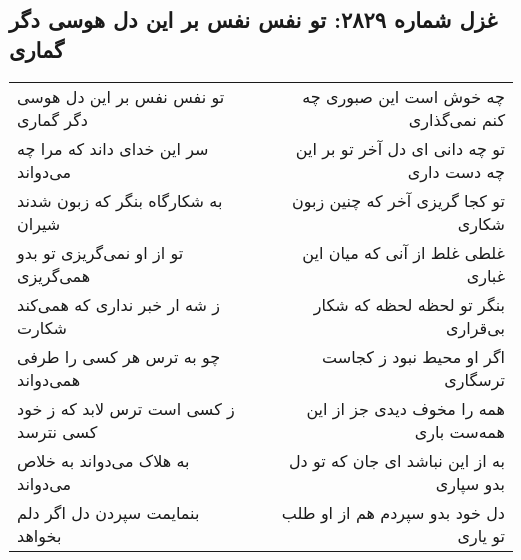 \begin{center}
\section*{غزل شماره ۲۸۲۹: تو نفس نفس بر این دل هوسی دگر گماری}
\label{sec:2829}
\begin{longtable}{l p{0.5cm} r}
تو نفس نفس بر این دل هوسی دگر گماری
&&
چه خوش است این صبوری چه کنم نمی‌گذاری
\\
سر این خدای داند که مرا چه می‌دواند
&&
تو چه دانی ای دل آخر تو بر این چه دست داری
\\
به شکارگاه بنگر که زبون شدند شیران
&&
تو کجا گریزی آخر که چنین زبون شکاری
\\
تو از او نمی‌گریزی تو بدو همی‌گریزی
&&
غلطی غلط از آنی که میان این غباری
\\
ز شه ار خبر نداری که همی‌کند شکارت
&&
بنگر تو لحظه لحظه که شکار بی‌قراری
\\
چو به ترس هر کسی را طرفی همی‌دواند
&&
اگر او محیط نبود ز کجاست ترسگاری
\\
ز کسی است ترس لابد که ز خود کسی نترسد
&&
همه را مخوف دیدی جز از این همه‌ست باری
\\
به هلاک می‌دواند به خلاص می‌دواند
&&
به از این نباشد ای جان که تو دل بدو سپاری
\\
بنمایمت سپردن دل اگر دلم بخواهد
&&
دل خود بدو سپردم هم از او طلب تو یاری
\\
\end{longtable}
\end{center}
